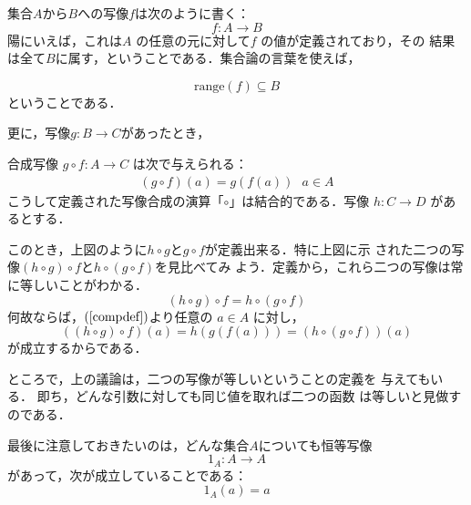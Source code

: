 集合$A$から$B$への写像$f$は次のように書く：
\[
 f: A \rightarrow B
\]
陽にいえば，これは$A$ の任意の元に対して$f$ の値が定義されており，その
結果は全て$B$に属す，ということである．集合論の言葉を使えば，

\[
 \mathrm{range}(f) \subseteq B
\]
ということである．

更に，写像$g: B \to C$があったとき，
\begin{center}
\end{center}
合成写像
$g \circ f : A \to C$ は次で与えられる：
\begin{align}
 (g \circ f)(a) = g(f(a))\ \ \  a \in A \label{compdef}
\end{align}
こうして定義された写像合成の演算「$\circ$」は結合的である．写像
$h: C \to D$ があるとする．

\begin{center}
\end{center}
このとき，上図のように$h \circ g$と$g \circ f$が定義出来る．特に上図に示
された二つの写像$(h\circ g) \circ f$と$h \circ (g \circ f)$を見比べてみ
よう．定義から，これら二つの写像は常に等しいことがわかる．
\[
 (h\circ g) \circ f = h \circ (g \circ f)
\]
何故ならば，$(\ref{compdef})$より任意の $a \in A$ に対し，
\[
 ((h\circ g) \circ f)(a) = h(g(f(a))) = (h \circ (g \circ f))(a)
\]
が成立するからである．

ところで，上の議論は，二つの写像が等しいということの定義を
与えてもいる．
即ち，どんな引数に対しても同じ値を取れば二つの函数
は等しいと見做すのである．

最後に注意しておきたいのは，どんな集合$A$についても恒等写像
\[
 1_A : A \to A
\]
があって，次が成立していることである：
\[
 1_A(a) = a
\]

